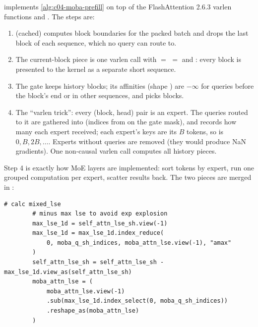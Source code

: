 \begin{implnote}[title={In the code: the efficient path, \texttt{moba\_efficient.py}}]
 implements \cref{alg:c04-moba-prefill} on top of the FlashAttention 2.6.3
varlen functions  and . The
steps are:
\begin{enumerate}
  \item {} (cached) computes block boundaries  for the packed
  batch and drops the last block of each sequence, which no query can route to.
  \item The current-block piece is one varlen call with  $=$
   $=$  and : every block is presented to the
  kernel as a separate short sequence.
  \item The gate keeps  history blocks; its affinities
   (shape ) are $-\infty$ for queries
  before the block's end or in other sequences, and  picks blocks.
  \item The ``varlen trick'': every (block, head) pair is an expert. The queries routed to it are
  gathered into  (indices from  on the gate mask), and
   records how many each expert received; each expert's keys are its $B$
  tokens, so  is $0,B,2B,\dots$. Experts without queries are removed
  (they would produce NaN gradients). One non-causal varlen call computes all history pieces.
\end{enumerate}
Step 4 is exactly how MoE layers are implemented: sort tokens by expert, run one grouped
computation per expert, scatter results back. The two pieces are merged in
:
\begin{lstlisting}[caption={Excerpt from \texttt{repos/\allowbreak{}MoonshotAI\_\_MoBA/\allowbreak{}moba/\allowbreak{}moba\_efficient.py}},label={lst:c04-moba-merge}]
        # calc mixed_lse
        # minus max lse to avoid exp explosion
        max_lse_1d = self_attn_lse_sh.view(-1)
        max_lse_1d = max_lse_1d.index_reduce(
            0, moba_q_sh_indices, moba_attn_lse.view(-1), "amax"
        )
        self_attn_lse_sh = self_attn_lse_sh - max_lse_1d.view_as(self_attn_lse_sh)
        moba_attn_lse = (
            moba_attn_lse.view(-1)
            .sub(max_lse_1d.index_select(0, moba_q_sh_indices))
            .reshape_as(moba_attn_lse)
        )


\end{lstlisting}
\end{implnote}
